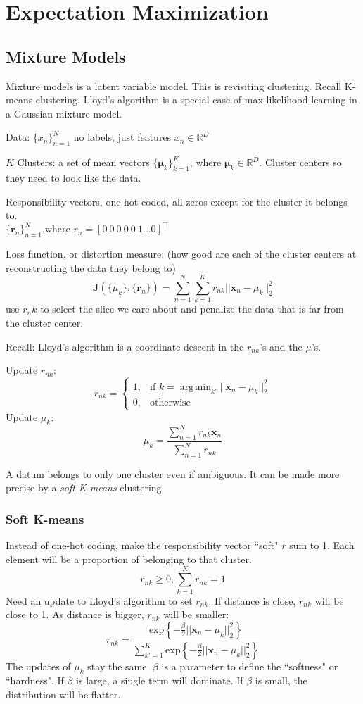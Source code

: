 \documentclass[11pt, oneside]{article}   	%
\DeclareMathOperator*{\argmin}{\arg\!\min}
\begin{document}
\section{Expectation Maximization}

\subsection{Mixture Models}

Mixture models is a latent variable model. This is revisiting clustering. Recall K-means clustering. Lloyd's algorithm is a special case of max likelihood learning in a Gaussian mixture model.

Data: $\{x_n\}_{n=1}^N$ no labels, just features $x_n \in \mathbb{R}^D$

$K$ Clusters: a set of mean vectors $\{\mathbf{\mu}_k\}_{k=1}^K \text{, where } \mathbf{\mu}_k \in \mathbb{R}^D$. Cluster centers so they need to look like the data.

Responsibility vectors, one hot coded, all zeros except for the cluster it belongs to.\\
$\{\mathbf{r}_n\}_{n=1}^N\text{,where }  r_n = [ 0\: 0\: 0\: 0\: 0\: 1 \hdots 0]^\intercal$ 

Loss function, or distortion measure: (how good are each of the cluster centers at reconstructing the data they belong to) 
\[
\mathbf{J}(\{\mu_k\},\{ \mathbf{r}_n\}) = \sum_{n=1}^N \sum_{k=1}^K r_{nk} ||\mathbf{x}_n - \mu_k||_2^2 
\]
use $r_nk$ to select the slice we care about and penalize the data that is far from the cluster center.

Recall: Lloyd's algorithm is a coordinate descent in the $r_{nk}$'s and the $\mu$'s.

Update $r_{nk}$:
\[
r_{nk} =
	\begin{cases}
	  	1, &\text{if  }k = \argmin_{k'} ||\mathbf{x}_n - \mu_k||_2^2 \\
		0, &\text{otherwise}
	\end{cases}
\]
Update $\mu_k$:
\[
\mu_k = \frac{\sum_{n=1}^N r_{nk}\mathbf{x}_n}{\sum_{n=1}^N r_{nk}}
\]

A datum belongs to only one cluster even if ambiguous. It can be made more precise by a \emph{soft K-means} clustering.

\subsubsection{Soft K-means}

Instead of one-hot coding, make the responsibility vector ``soft" $r$ sum to 1. Each element will be a proportion of belonging to that cluster.
\[
r_{nk} \ge 0, \sum_{k=1}^K r_{nk} = 1
\]
Need an update to Lloyd's algorithm to set $r_{nk}$. If distance is close, $r_{nk}$ will be close to 1. As distance is bigger, $r_{nk}$ will be smaller:
\[
r_{nk} = \frac{\text{exp} \left\{ -\frac{\beta}{2} ||\mathbf{x}_n - \mu_k||_2^2 \right\}}
			 {\sum_{k'=1}^K\text{exp} \left\{ -\frac{\beta}{2} ||\mathbf{x}_n - \mu_k||_2^2 \right\} }
\]
The updates of $\mu_k$ stay the same. $\beta$ is a parameter to define the ``softness" or ``hardness". If $\beta$ is large, a single term will dominate. If $\beta$ is small, the distribution will be flatter.
\end{document}

